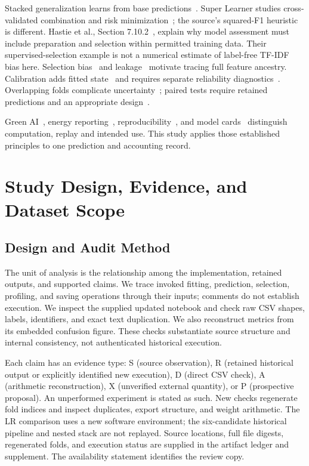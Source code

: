\documentclass[doublecolumn]{ijcvsplatex}
\begin{document}
Stacked generalization learns from base predictions~\cite{wolpert1992stacked}. Super Learner studies cross-validated combination and risk minimization~\cite{vanderlaan2007super}; the source's squared-F1 heuristic is different. Hastie et al., Section 7.10.2~\cite{hastie2009elements}, explain why model assessment must include preparation and selection within permitted training data. Their supervised-selection example is not a numerical estimate of label-free TF-IDF bias here. Selection bias~\cite{varma2006bias,cawley2010overfitting} and leakage~\cite{kapoor2023leakage} motivate tracing full feature ancestry. Calibration adds fitted state~\cite{niculescumizil2005probabilities} and requires separate reliability diagnostics~\cite{vaicenavicius2019calibration}. Overlapping folds complicate uncertainty~\cite{bengio2004variance}; paired tests require retained predictions and an appropriate design~\cite{dror2018significance}.

Green AI~\cite{schwartz2020greenai}, energy reporting~\cite{henderson2020systematic}, reproducibility~\cite{pineau2021reproducibility}, and model cards~\cite{mitchell2019modelcards} distinguish computation, replay and intended use. This study applies those established principles to one prediction and accounting record.

\section{Study Design, Evidence, and Dataset Scope}
\label{sec:design}

\subsection{Design and Audit Method}
The unit of analysis is the relationship among the implementation, retained outputs, and supported claims. We trace invoked fitting, prediction, selection, profiling, and saving operations through their inputs; comments do not establish execution. We inspect the supplied updated notebook and check raw CSV shapes, labels, identifiers, and exact text duplication. We also reconstruct metrics from its embedded confusion figure. These checks substantiate source structure and internal consistency, not authenticated historical execution.

Each claim has an evidence type: S (source observation), R (retained historical output or explicitly identified new execution), D (direct CSV check), A (arithmetic reconstruction), X (unverified external quantity), or P (prospective proposal). An unperformed experiment is stated as such. New checks regenerate fold indices and inspect duplicates, export structure, and weight arithmetic. The LR comparison uses a new software environment; the six-candidate historical pipeline and nested stack are not replayed. Source locations, full file digests, regenerated folds, and execution status are supplied in the artifact ledger and supplement. The availability statement identifies the review copy.
\end{document}
